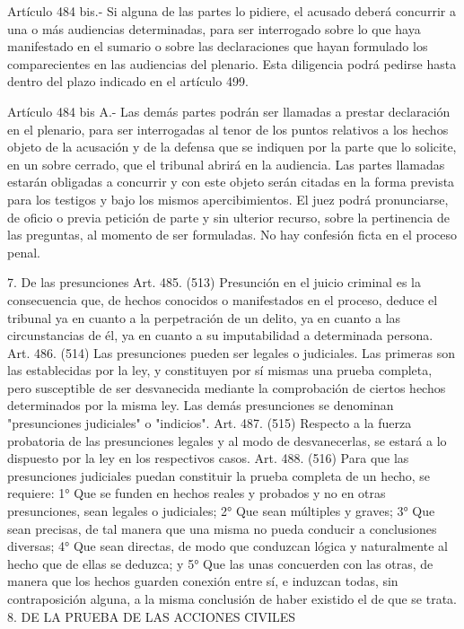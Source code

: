     Artículo 484 bis.- Si alguna de las partes lo pidiere, el acusado deberá concurrir a una o más audiencias determinadas, para ser interrogado sobre lo que haya manifestado en el sumario o sobre las declaraciones que hayan formulado los comparecientes en las audiencias del plenario. Esta diligencia podrá pedirse hasta dentro del plazo indicado en el artículo 499.

    Artículo 484 bis A.- Las demás partes podrán ser llamadas a prestar declaración en el plenario, para ser interrogadas al tenor de los puntos relativos a los hechos objeto de la acusación y de la defensa que se indiquen por la parte que lo solicite, en un sobre cerrado, que el tribunal abrirá en la audiencia.
    Las partes llamadas estarán obligadas a concurrir y con este objeto serán citadas en la forma prevista para los testigos y bajo los mismos apercibimientos.
    El juez podrá pronunciarse, de oficio o previa petición de parte y sin ulterior recurso, sobre la pertinencia de las preguntas, al momento de ser formuladas.
    No hay confesión ficta en el proceso penal.

    7. De las presunciones
    Art. 485. (513) Presunción en el juicio criminal es la consecuencia que, de hechos conocidos o manifestados en el proceso, deduce el tribunal ya en cuanto a la perpetración de un delito, ya en cuanto a las circunstancias de él, ya en cuanto a su imputabilidad a determinada persona.
    Art. 486. (514) Las presunciones pueden ser legales o judiciales. Las primeras son las establecidas por la ley, y constituyen por sí mismas una prueba completa, pero susceptible de ser desvanecida mediante la comprobación de ciertos hechos determinados por la misma ley.
    Las demás presunciones se denominan "presunciones judiciales" o "indicios".
    Art. 487. (515) Respecto a la fuerza probatoria de las presunciones legales y al modo de desvanecerlas, se estará a lo dispuesto por la ley en los respectivos casos.
    Art. 488. (516) Para que las presunciones judiciales puedan constituir la prueba completa de un hecho, se requiere:
    1° Que se funden en hechos reales y probados y no en otras presunciones, sean legales o judiciales;
    2° Que sean múltiples y graves;
    3° Que sean precisas, de tal manera que una misma no pueda conducir a conclusiones diversas;
    4° Que sean directas, de modo que conduzcan lógica y naturalmente al hecho que de ellas se deduzca; y
    5° Que las unas concuerden con las otras, de manera que los hechos guarden conexión entre sí, e induzcan todas, sin contraposición alguna, a la misma conclusión de haber existido el de que se trata.
    8. DE LA PRUEBA DE LAS ACCIONES CIVILES

